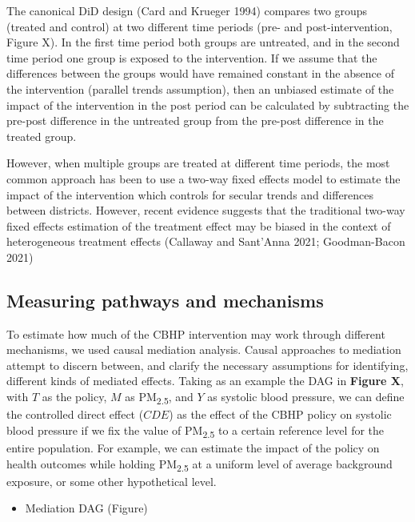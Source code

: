 \documentclass[
  letterpaper,
  DIV=11,
  numbers=noendperiod]{scrartcl}
\providecommand{\tightlist}{%
  \setlength{\itemsep}{0pt}\setlength{\parskip}{0pt}}\usepackage{longtable,booktabs,array}
\begin{document}
The canonical DiD design (Card and Krueger 1994) compares two groups
(treated and control) at two different time periods (pre- and
post-intervention, Figure X). In the first time period both groups are
untreated, and in the second time period one group is exposed to the
intervention. If we assume that the differences between the groups would
have remained constant in the absence of the intervention (parallel
trends assumption), then an unbiased estimate of the impact of the
intervention in the post period can be calculated by subtracting the
pre-post difference in the untreated group from the pre-post difference
in the treated group.

However, when multiple groups are treated at different time periods, the
most common approach has been to use a two-way fixed effects model to
estimate the impact of the intervention which controls for secular
trends and differences between districts. However, recent evidence
suggests that the traditional two-way fixed effects estimation of the
treatment effect may be biased in the context of heterogeneous treatment
effects (Callaway and Sant'Anna 2021; Goodman-Bacon 2021)

\subsection{Measuring pathways and
mechanisms}\label{measuring-pathways-and-mechanisms}

To estimate how much of the CBHP intervention may work through different
mechanisms, we used causal mediation analysis. Causal approaches to
mediation attempt to discern between, and clarify the necessary
assumptions for identifying, different kinds of mediated effects. Taking
as an example the DAG in \textbf{Figure X}, with \(T\) as the policy,
\(M\) as PM\textsubscript{2.5}, and \(Y\) as systolic blood pressure, we
can define the controlled direct effect (\(CDE\)) as the effect of the
CBHP policy on systolic blood pressure if we fix the value of
PM\textsubscript{2.5} to a certain reference level for the entire
population. For example, we can estimate the impact of the policy on
health outcomes while holding PM\textsubscript{2.5} at a uniform level
of average background exposure, or some other hypothetical level.

\begin{itemize}
\tightlist
\item
  Mediation DAG (Figure)
\end{itemize}
\end{document}
